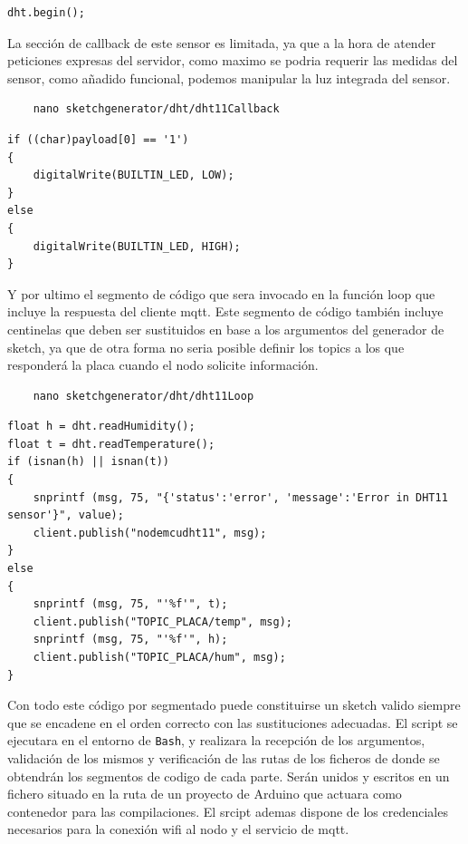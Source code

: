 \begin{verbatim}
dht.begin();
\end{verbatim}

La sección de callback de este sensor es limitada, ya que a la hora de atender peticiones expresas del servidor, como maximo se podria requerir las medidas del sensor, como añadido funcional, podemos manipular la luz integrada del sensor.

\begin{verbatim}
    nano sketchgenerator/dht/dht11Callback
\end{verbatim}

\begin{verbatim}
if ((char)payload[0] == '1')
{
    digitalWrite(BUILTIN_LED, LOW);
}
else
{
    digitalWrite(BUILTIN_LED, HIGH);
}
\end{verbatim}

Y por ultimo el segmento de código que sera invocado en la función loop que incluye la respuesta del cliente \gls{mqtt}. Este segmento de código también incluye centinelas que deben ser sustituidos en base a los argumentos del generador de \gls{sketch}, ya que de otra forma no seria posible definir los topics a los que responderá la placa cuando el nodo solicite información.
\begin{verbatim}
    nano sketchgenerator/dht/dht11Loop
\end{verbatim}

\begin{verbatim}
float h = dht.readHumidity();
float t = dht.readTemperature();
if (isnan(h) || isnan(t))
{
    snprintf (msg, 75, "{'status':'error', 'message':'Error in DHT11 sensor'}", value);
    client.publish("nodemcudht11", msg);
}
else
{
    snprintf (msg, 75, "'%f'", t);
    client.publish("TOPIC_PLACA/temp", msg);
    snprintf (msg, 75, "'%f'", h);
    client.publish("TOPIC_PLACA/hum", msg);
}
\end{verbatim}

Con todo este código por segmentado puede constituirse un \gls{sketch} valido siempre que se encadene en el orden correcto con las sustituciones adecuadas. El script se ejecutara en el entorno de \verb|Bash|, y realizara la recepción de los argumentos, validación de los mismos y verificación de las rutas de los ficheros de donde se obtendrán los segmentos de codigo de cada parte. Serán unidos y escritos en un fichero situado en la ruta de un proyecto de Arduino que actuara como contenedor para las compilaciones. El srcipt ademas dispone de los credenciales necesarios para la conexión \gls{wifi} al nodo y el servicio de \gls{mqtt}.

